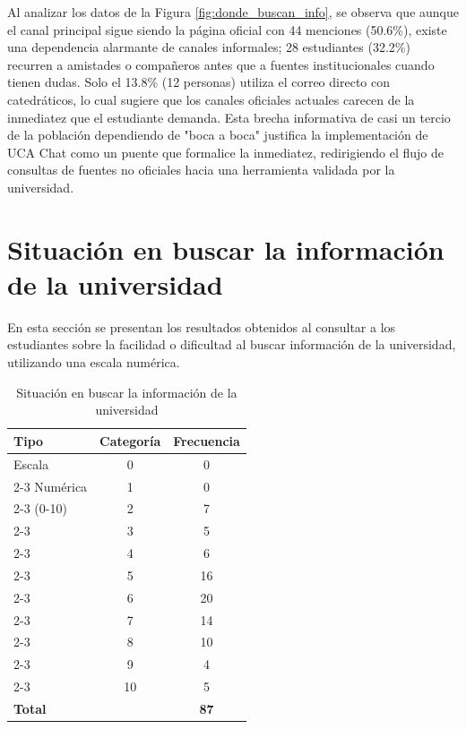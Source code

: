 {{Al analizar los datos de la Figura \ref{fig:donde_buscan_info}, se observa que aunque el canal principal sigue siendo la página oficial con 44 menciones (50.6\%), existe una dependencia alarmante de canales informales; 28 estudiantes (32.2\%) recurren a amistades o compañeros antes que a fuentes institucionales cuando tienen dudas. Solo el 13.8\% (12 personas) utiliza el correo directo con catedráticos, lo cual sugiere que los canales oficiales actuales carecen de la inmediatez que el estudiante demanda. Esta brecha informativa de casi un tercio de la población dependiendo de "boca a boca" justifica la implementación de UCA Chat como un puente que formalice la inmediatez, redirigiendo el flujo de consultas de fuentes no oficiales hacia una herramienta validada por la universidad.

\section{Situación en buscar la información de la universidad}
        En esta sección se presentan los resultados obtenidos al consultar a los estudiantes sobre la facilidad o dificultad al buscar información de la universidad, utilizando una escala numérica.

        \begin{table}[H]
            \centering
            \caption{Situación en buscar la información de la universidad}
            \begin{tabular}{|l|c|c|}
                \hline
                \textbf{Tipo} & \textbf{Categoría} & \textbf{Frecuencia} \\ \hline
                Escala & 0 & 0 \\ \cline{2-3} 
                Numérica & 1 & 0 \\ \cline{2-3} 
                (0-10) & 2 & 7 \\ \cline{2-3} 
                 & 3 & 5 \\ \cline{2-3} 
                 & 4 & 6 \\ \cline{2-3} 
                 & 5 & 16 \\ \cline{2-3} 
                 & 6 & 20 \\ \cline{2-3} 
                 & 7 & 14 \\ \cline{2-3} 
                 & 8 & 10 \\ \cline{2-3} 
                 & 9 & 4 \\ \cline{2-3} 
                 & 10 & 5 \\ \hline
                \textbf{Total} & \multicolumn{1}{c|}{} & \textbf{87} \\ \hline
            \end{tabular}
            \label{tab:situacion_buscar_info}
        \end{table}

}}
